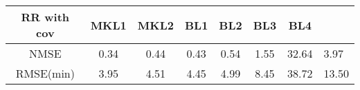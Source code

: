 \begin{tabular}{ccccccc}
	\hline
	RR with cov & MKL1 & MKL2 & BL1 & BL2 & BL3 & BL4\\
	\hline
	NMSE	 & 0.34 & 0.44 & 0.43 & 0.54 & 1.55 & 32.64 & 3.97\\
	RMSE(min)	 & 3.95 & 4.51 & 4.45 & 4.99 & 8.45 & 38.72 & 13.50\\
	\hline
\end{tabular}